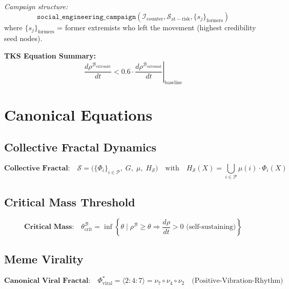 \documentclass[11pt,twoside]{book}
\theoremstyle{definition}
\theoremstyle{plain}
\theoremstyle{remark}
\newcommand{\noe}[1]{\nu_{#1}}
\newcommand{\Frac}{\Phi}
\begin{document}
\begin{tcolorbox}[colback=yellow!5!white,colframe=yellow!65!black,title=\textbf{Scenario: Counter-Extremism Campaign},breakable]
\textit{Campaign structure:}
\[
    \mathtt{social\_engineering\_campaign}(\mathcal{I}_{\mathrm{counter}}, \mathcal{S}_{\mathrm{at-risk}}, \{s_j\}_{\mathrm{formers}})
\]
where $\{s_j\}_{\mathrm{formers}}$ = former extremists who left the movement (highest credibility seed nodes).

\textbf{TKS Equation Summary:}
\begin{equation}
\boxed{
    \frac{d\rho^{\mathcal{B}_{\mathrm{extremist}}}}{dt} < 0.6 \cdot \left.\frac{d\rho^{\mathcal{B}_{\mathrm{extremist}}}}{dt}\right|_{\mathrm{baseline}}
}
\end{equation}

\end{tcolorbox}

\chapter{Canonical Equations}

\section{Collective Fractal Dynamics}

\begin{equation}
\boxed{
    \textbf{Collective Fractal:} \quad
    \mathcal{S} = \bigl( \{\Frac_i\}_{i \in \mathcal{P}}, \; G, \; \mu, \; H_{\mathcal{S}} \bigr)
    \quad \text{with} \quad
    H_{\mathcal{S}}(X) = \bigcup_{i \in \mathcal{P}} \mu(i) \cdot \Frac_i(X)
}
\label{eq:se-collective-fractal}
\end{equation}

\section{Critical Mass Threshold}

\begin{equation}
\boxed{
    \textbf{Critical Mass:} \quad
    \theta_{\mathrm{crit}}^{\mathcal{B}} = \inf \left\{ \theta \;\Big|\;
    \rho^{\mathcal{B}} \geq \theta \Rightarrow \frac{d\rho}{dt} > 0
    \text{ (self-sustaining)} \right\}
}
\label{eq:se-critical-mass}
\end{equation}

\section{Meme Virality}

\begin{equation}
\boxed{
    \textbf{Canonical Viral Fractal:} \quad
    \Frac_{\mathrm{viral}}^* = \langle 2:4:7 \rangle
    = \noe{7} \circ \noe{4} \circ \noe{2}
    \quad \text{(Positive-Vibration-Rhythm)}
}
\label{eq:se-viral-fractal}
\end{equation}
\end{document}
